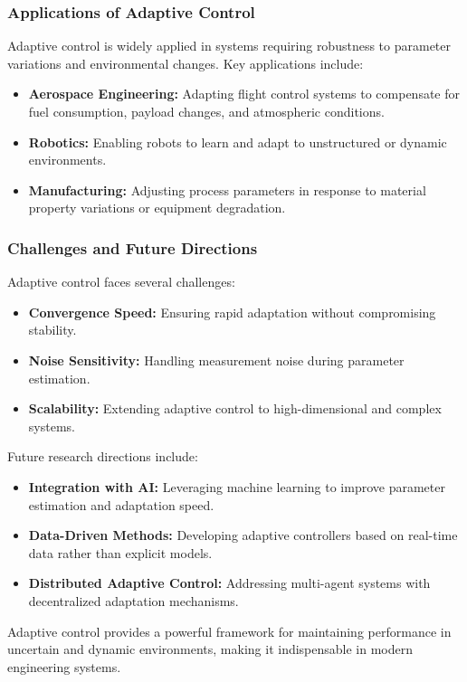 \documentclass{IEEEojcsys}
\begin{document}
\subsubsection{Applications of Adaptive Control}
Adaptive control is widely applied in systems requiring robustness to parameter variations and environmental changes. Key applications include:
\begin{itemize}
    \item \textbf{Aerospace Engineering:} Adapting flight control systems to compensate for fuel consumption, payload changes, and atmospheric conditions.
    \item \textbf{Robotics:} Enabling robots to learn and adapt to unstructured or dynamic environments.
    \item \textbf{Manufacturing:} Adjusting process parameters in response to material property variations or equipment degradation.
\end{itemize}

\subsubsection{Challenges and Future Directions}
Adaptive control faces several challenges:
\begin{itemize}
    \item \textbf{Convergence Speed:} Ensuring rapid adaptation without compromising stability.
    \item \textbf{Noise Sensitivity:} Handling measurement noise during parameter estimation.
    \item \textbf{Scalability:} Extending adaptive control to high-dimensional and complex systems.
\end{itemize}
Future research directions include:
\begin{itemize}
    \item \textbf{Integration with AI:} Leveraging machine learning to improve parameter estimation and adaptation speed.
    \item \textbf{Data-Driven Methods:} Developing adaptive controllers based on real-time data rather than explicit models.
    \item \textbf{Distributed Adaptive Control:} Addressing multi-agent systems with decentralized adaptation mechanisms.
\end{itemize}

Adaptive control provides a powerful framework for maintaining performance in uncertain and dynamic environments, making it indispensable in modern engineering systems.
\end{document}
